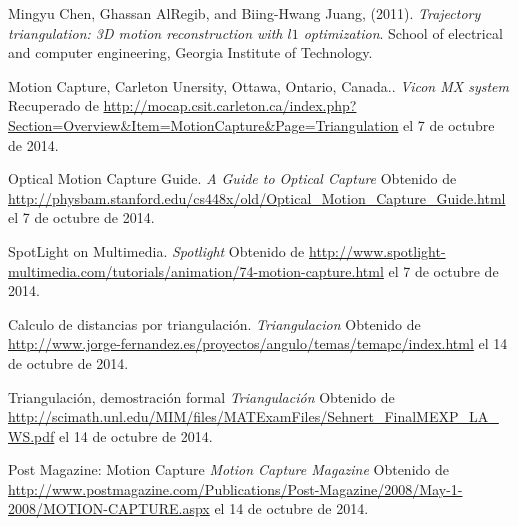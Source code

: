\documentclass[11pt,letterpaper]{article}     %
\begin{document}
\begin{thebibliography}{5}
 Mingyu Chen, Ghassan AlRegib, and Biing-Hwang Juang, (2011). \textit{Trajectory triangulation: 3D motion reconstruction with $l1$ optimization}. School of electrical and computer engineering, Georgia Institute of Technology.


 Motion Capture, Carleton Unersity, Ottawa, Ontario, Canada..  \textit{Vicon MX system} Recuperado de \url{http://mocap.csit.carleton.ca/index.php?Section=Overview&Item=MotionCapture&Page=Triangulation} el 7 de octubre de 2014.

 Optical Motion Capture Guide. \textit{A Guide to Optical Capture} Obtenido de \url{http://physbam.stanford.edu/cs448x/old/Optical_Motion_Capture_Guide.html}  el 7 de octubre de 2014.


 SpotLight on Multimedia. \textit{Spotlight} Obtenido de \url{http://www.spotlight-multimedia.com/tutorials/animation/74-motion-capture.html}  el 7 de octubre de 2014.

 Calculo de distancias por triangulaci\' on. \textit{Triangulacion} Obtenido de \url{http://www.jorge-fernandez.es/proyectos/angulo/temas/temapc/index.html}  el 14 de octubre de 2014.

 Triangulaci\' on, demostraci\' on formal \textit{Triangulaci\' on} Obtenido de \url{http://scimath.unl.edu/MIM/files/MATExamFiles/Sehnert_FinalMEXP_LA_WS.pdf}  el 14 de octubre de 2014.

 Post Magazine: Motion Capture \textit{Motion Capture Magazine} Obtenido de \url{http://www.postmagazine.com/Publications/Post-Magazine/2008/May-1-2008/MOTION-CAPTURE.aspx} el 14 de octubre de 2014.



\end{thebibliography} 
\end{document}
